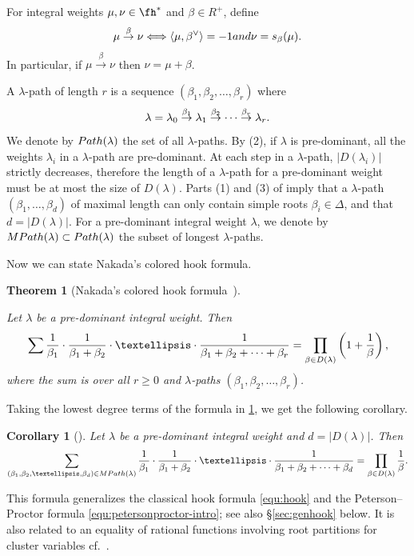 \documentclass[11pt]{article}
\newtheorem{theorem}[theo]{Theorem}
\newtheorem{corol}[theo]{Corollary}
\theoremstyle{definition}
\numberwithin{equation}{section}
\begin{document}
For integral weights $\mu, \nu \in \fh^*$ and $\beta \in R^{+}$, define
\[\mu \overset{\beta}{\to} \nu \Longleftrightarrow \langle \mu, \beta^\vee\rangle=-1 \textit{ and } \nu=s_\beta(\mu) \/.\] In particular, if
$\mu \overset{\beta}{\to} \nu$ then $\nu = \mu + \beta$.

A $\lambda$-path of length $r$ is a sequence $(\beta_1,\beta_2,\ldots, \beta_r)$ where 
$$
\lambda=\lambda_0 \overset{\beta_1}{\to} \lambda_1 
\overset{\beta_2}{\to} \cdots
\overset{\beta_r}{\to} \lambda_r \/.
$$
We denote by ${\rm Path}(\lambda)$ the set of all $\lambda$-paths.
By (2), if $\lambda$ is pre-dominant, all the weights $\lambda_i$ in a $\lambda$-path are
pre-dominant. At each step in a $\lambda$-path, $|D(\lambda_i)|$ strictly decreases, therefore the 
length of a $\lambda$-path for a pre-dominant weight must be at most the size of $D(\lambda)$. 
Parts (1) and (3) of  imply that a $\lambda$-path $(\beta_1, \ldots, \beta_d)$ of maximal length can only contain simple roots $\beta_i \in \Delta$, and that $d = |D(\lambda)|$. For a pre-dominant integral weight $\lambda$, 
we denote by ${\rm MPath}(\lambda)\subset {\rm Path}(\lambda)$ the subset of longest $\lambda$-paths.

Now we can state Nakada's colored hook formula.
\begin{theorem}[{Nakada's colored hook formula~\cite[Theorem 7.1]{nakada:colored}}]\label{thm:Nak}
	
	Let $\lambda$ be a pre-dominant integral weight. Then 
	$$
	\sum \frac{1}{\beta_1}\cdot \frac{1}{\beta_1+\beta_2}\cdot \ldots \cdot\frac{1}{\beta_1+\beta_2+\cdots +\beta_r}
	=\prod_{\beta\in D(\lambda)}\left(1+\frac{1}{\beta}\right) \/, 
	$$ where the sum is over all $r \ge 0$ and $\lambda$-paths $(\beta_1,\beta_2,\ldots,\beta_r)$.
\end{theorem}

Taking the lowest degree terms of the formula in \cref{thm:Nak},
we get the following corollary.
\begin{corol}[{\cite[Corollary 7.2]{nakada:colored}}]
	Let $\lambda$ be a pre-dominant integral weight and $d=|D(\lambda)|$.
	Then 
	$$
	\sum_{
		(\beta_{1},\beta_{2},\ldots,\beta_d)\in {\rm MPath}(\lambda)}
	\frac{1}{\beta_1}\cdot \frac{1}{\beta_1+\beta_2}\cdot \ldots \cdot\frac{1}{\beta_1+\beta_2+\cdots +\beta_d}
	=\prod_{\beta\in D(\lambda)}\frac{1}{\beta}.
	$$
\end{corol}
This formula generalizes the classical hook formula \eqref{equ:hook} and the Peterson--Proctor formula \eqref{equ:petersonproctor-intro}; see also \S\ref{sec:genhook} below. It is also related to an equality of rational functions involving root partitions for cluster variables cf.~\cite{Cas19,casbi2019newton}.
\end{document}
